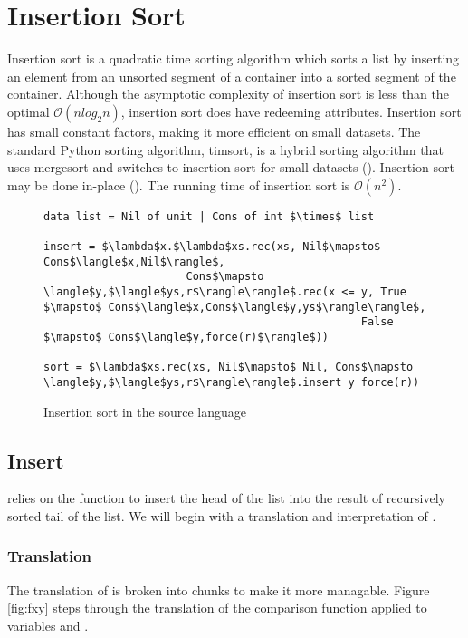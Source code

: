 \section{Insertion Sort}
Insertion sort is a quadratic time sorting algorithm which sorts a list by inserting an element from an unsorted segment of a container into a sorted segment of the container.
Although the asymptotic complexity of insertion sort is less than the optimal $\mathcal{O}(nlog_2n)$, insertion sort does have redeeming attributes. 
Insertion sort has small constant factors, making it more efficient on small datasets. 
The standard Python sorting algorithm, timsort, is a hybrid sorting algorithm that uses mergesort and switches to insertion sort for small datasets (\citet{cpython}).
Insertion sort may be done in-place (\citet{Cormen2001}).
The running time of insertion sort is $\mathcal{O}(n^2)$.

\begin{figure}[H]
\caption{Insertion sort in the source language}
\begin{lstlisting}
data list = Nil of unit | Cons of int $\times$ list

insert = $\lambda$x.$\lambda$xs.rec(xs, Nil$\mapsto$ Cons$\langle$x,Nil$\rangle$,
                      Cons$\mapsto \langle$y,$\langle$ys,r$\rangle\rangle$.rec(x <= y, True $\mapsto$ Cons$\langle$x,Cons$\langle$y,ys$\rangle\rangle$,
                                                 False $\mapsto$ Cons$\langle$y,force(r)$\rangle$))

sort = $\lambda$xs.rec(xs, Nil$\mapsto$ Nil, Cons$\mapsto \langle$y,$\langle$ys,r$\rangle\rangle$.insert y force(r))
\end{lstlisting}
\end{figure}

\subsection{Insert}
 relies on the function  to insert the head of the list into the result of recursively sorted tail of the list.
We will begin with a translation and interpretation of .

\subsubsection{Translation}
The translation of  is broken into chunks to make it more managable.
Figure \ref{fig:fxy} steps through the translation of the comparison function \T{<=} applied to variables  and .

